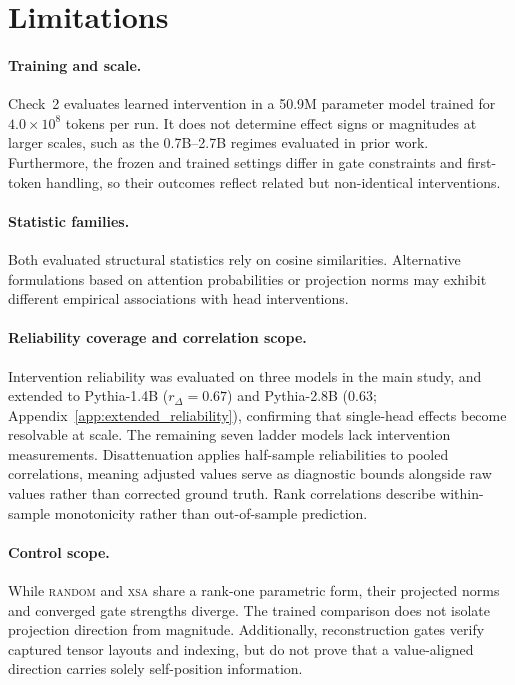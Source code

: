\documentclass{article} %
\begin{document}
\section{Limitations}

\paragraph{Training and scale.} Check~2 evaluates learned intervention in a
50.9M parameter model trained for $4.0\times10^{8}$ tokens per run. It does
not determine effect signs or magnitudes at larger scales, such as the
0.7B--2.7B regimes evaluated in prior work. Furthermore, the frozen and trained
settings differ in gate constraints and first-token handling, so their outcomes
reflect related but non-identical interventions.

\paragraph{Statistic families.} Both evaluated structural statistics rely on
cosine similarities. Alternative formulations based on attention probabilities
or projection norms may exhibit different empirical associations with head
interventions.

\paragraph{Reliability coverage and correlation scope.} Intervention reliability
was evaluated on three models in the main study, and extended to Pythia-1.4B ($r_\Delta = 0.67$)
and Pythia-2.8B ($0.63$; Appendix~\ref{app:extended_reliability}), confirming that single-head
effects become resolvable at scale. The remaining seven ladder models lack intervention measurements.
Disattenuation applies half-sample reliabilities to pooled correlations, meaning adjusted values
serve as diagnostic bounds alongside raw values rather than corrected ground truth. Rank correlations
describe within-sample monotonicity rather than out-of-sample prediction.

\paragraph{Control scope.} While \textsc{random} and \textsc{xsa} share a
rank-one parametric form, their projected norms and converged gate strengths
diverge. The trained comparison does not isolate projection direction from
magnitude. Additionally, reconstruction gates verify captured tensor layouts
and indexing, but do not prove that a value-aligned direction carries solely
self-position information.
\end{document}
